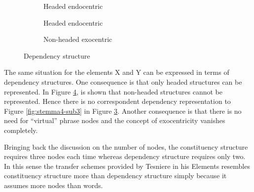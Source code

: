     \begin{figure}[!ht]
        \centering
        \begin{subfigure}{.33\textwidth}
            \centering
            \caption{Headed endocentric}
            \label{fig:stemma5-sub1}
        \end{subfigure}%
        \begin{subfigure}{.33\textwidth}
            \centering
            \caption{Headed endocentric}
            \label{fig:stemma5-sub2}
        \end{subfigure}
        \begin{subfigure}{.33\textwidth}
            \centering
            \caption{Non-headed exocentric}
            \label{fig:stemma5-sub3}
        \end{subfigure}
        \caption{Dependency structure}
        \label{fig:stemma5}
    \end{figure}
    
    The same situation for the elements X and Y can be expressed in terms of dependency structures. One consequence is that only headed structures can be represented. In Figure \ref{fig:stemma5}, is shown that non-headed structures cannot be represented. Hence there is no correspondent dependency representation to Figure \ref{fig:stemma4-sub3} in Figure \ref{fig:stemma5-sub3}. Another consequence is that there is no need for ``virtual'' phrase nodes and the concept of exocentricity vanishes completely.
    
    Bringing back the discussion on the number of nodes, the constituency structure requires three nodes each time whereas dependency structure requires only two. In this sense the transfer schemes provided by Tesniere in his Elements \citep{Tesniere59} resembles constituency structure more than dependency structure simply because it assumes more nodes than words. 

